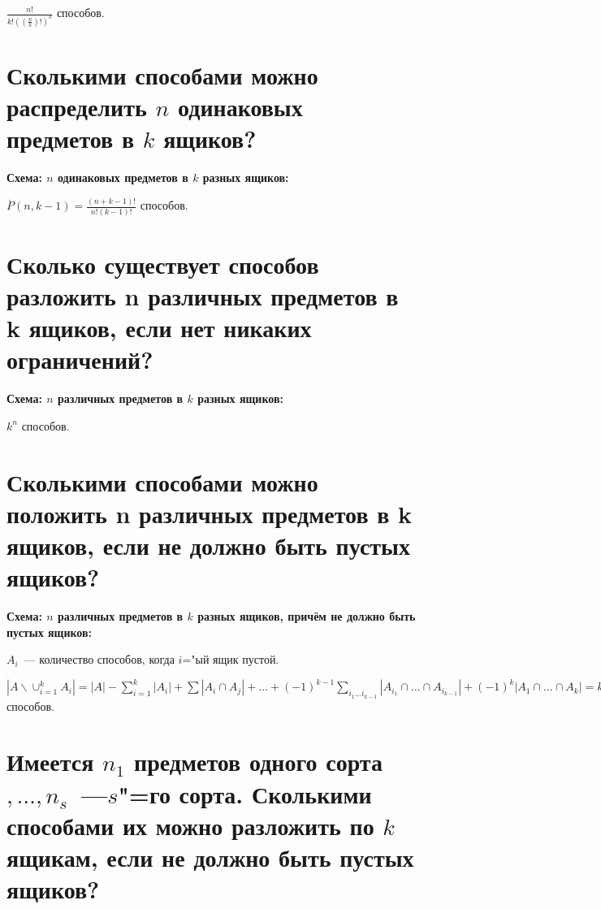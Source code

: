     \begin{center}
        $\frac{n!}{k!((\frac{n}{k})!)^{k}}$ способов.
    \end{center}

\section{Сколькими способами можно распределить $n$ одинаковых предметов в $k$ ящиков?}    

\textbf{Схема: $n$ одинаковых предметов в $k$ разных ящиков:}
    \smallskip

    \begin{center}
        $\overline{P}(n, k-1) = \frac{(n + k - 1)!}{n!(k - 1)!}$ способов.
    \end{center}

\section{Сколько существует способов разложить n различных  предметов в k ящиков, если 
нет никаких ограничений?}    

\textbf{Схема: $n$ различных предметов в $k$ разных ящиков:}
    \smallskip

\begin{center}
    $k^n$ способов.
\end{center}

\section{Сколькими способами можно положить  n различных предметов в k ящиков, если 
не должно быть пустых ящиков?}

\textbf{Схема: $n$ различных предметов в $k$ разных ящиков, причём не должно
быть пустых ящиков:}
    \smallskip

\begin{center}
    $A_i$~--- количество способов, когда $i$="ый ящик пустой.
    \bigskip

    $|A \backslash \cup^{k}_{i = 1} A_i| = |A| - \sum^{k}_{i = 1} |A_i| + \sum |A_i \cap A_j| +
    \dots + (-1)^{k - 1} \sum_{i_1 \dots i_{k - 1}} |A_{i_1} \cap \dots \cap A_{i_{k - 1}}| +
    (-1)^{k} |A_1 \cap \dots \cap A_k| = k^n - C^1_k (k - 1)^n + C^2_k(k - 2)^n +
    \dots + (-1)^{k - 1} C^{k - 1}_k \cdot 1^n$ способов.
\end{center}

\section{Имеется $n_1$ предметов одного сорта$, \dots, n_s$~---$s$"=го сорта.
Сколькими способами их можно разложить по $k$ ящикам, если не должно быть
пустых ящиков?}

